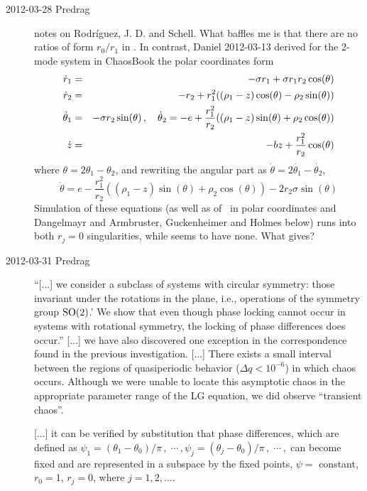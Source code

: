 \begin{description}

\item[2012-03-28 Predrag]
notes on Rodr\'iguez, J. D. and Schell.
What baffles me is that there are no ratios of form $r_0/r_1$ in
. In contrast, Daniel 2012-03-13 derived for the
2-mode system in ChaosBook the polar coordinates form
\begin{eqnarray}
   \dot{r}_1 &=& -\sigma r_1 + \sigma r_1 r_2 \cos(\theta)\nonumber \\ 
   \dot{r}_2 &=& -r_2 + r_1^2 ((\rho_1 - z) \cos(\theta) - \rho_2 \sin(\theta))\nonumber \\ 
   \dot{\theta}_1 &=&  -\sigma r_2 \sin(\theta)\,,\quad
   \dot{\theta}_2  =  -e + \frac{r_1^2}{r_2} ((\rho_1 -z) \sin(\theta)
                       + \rho_2 \cos(\theta))\nonumber \\ 
   \dot{z} &=& -b z + \frac{r_1^2}{r_2} \cos(\theta)
\end{eqnarray}
where $\theta = 2 \theta_1 - \theta_2$, and
rewriting the angular part as $\dot{\theta} = 2 \dot{\theta_1} - \dot{\theta_2}$,
\[
\dot{\theta} = e - \frac{r_1^2}{r_2} ( (\rho_1- z) \sin(\theta)+\rho_2 \cos(\theta))
- 2 r_2 \sigma \sin(\theta)
\]
Simulation of these equations (as well as of \cLe\ in polar coordinates
and Dangelmayr and Armbruster, Guckenheimer and
Holmes  below)
runs into both $r_j= 0$ singularities, while  seems to
have none. What gives?

\item[2012-03-31 Predrag]
``[...] we consider a subclass of systems with circular symmetry: those
invariant under the rotations in the plane, i.e., operations of
the symmetry group $\textrm{SO}(2)$.'                                  \toCB
[...] We show that even though phase locking cannot occur in systems with
rotational symmetry, the locking of phase differences does occur.''
[...] we have also discovered one exception in the
correspondence found in the previous investigation.
[...] There exists a small interval between the regions of quasiperiodic
behavior ($\Delta q < 10^{-6} $) in which chaos occurs. Although we were
unable to locate this asymptotic chaos in the appropriate parameter range
of the LG equation, we did observe ``transient chaos''.

[...] it can be verified by substitution that phase
differences, which are defined as
\(
\psi_1 = (\theta_1-\theta_0)/\pi \,,\;
\cdots\,,
\psi_j = (\theta_j-\theta_0)/\pi \,,\;
\cdots\,,
\)
can become fixed and are represented in a subspace by the fixed points,
$\psi =$ constant, $r_0= 1$, $r_j= 0$, where $j= 1,2,\dots$.


\end{description}
